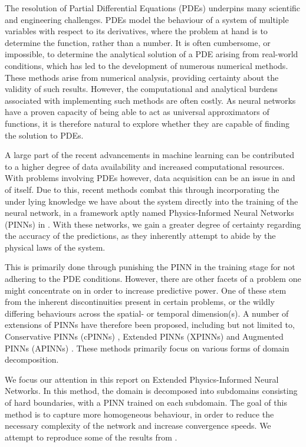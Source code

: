 The resolution of Partial Differential Equations (PDEs) underpins many scientific and engineering challenges.
PDEs model the behaviour of a system of multiple variables with respect to its derivatives, where the problem at hand is to determine the function, rather than a number.
It is often cumbersome, or impossible, to determine the analytical solution of a PDE arising from real-world conditions, which has led to the development of numerous numerical methods.
These methods arise from numerical analysis, providing certainty about the validity of such results.
However, the computational and analytical burdens associated with implementing such methods are often costly.
As neural networks have a proven capacity of being able to act as universal approximators of functions, it is therefore natural to explore whether they are capable of finding the solution to PDEs.

A large part of the recent advancements in machine learning can be contributed to a higher degree of data availability and increased computational resources.
With problems involving PDEs however, data acquisition can be an issue in and of itself.
Due to this, recent methods combat this through incorporating the under lying knowledge we have about the system directly into the training of the neural network, in a framework aptly named Physics-Informed Neural Networks (PINNs) in \textcite{RAISSI2019686}.
With these networks, we gain a greater degree of certainty regarding the accuracy of the predictions, as they inherently attempt to abide by the physical laws of the system.

This is primarily done through punishing the PINN in the training stage for not adhering to the PDE conditions.
However, there are other facets of a problem one might concentrate on in order to increase predictive power.
One of these stem from the inherent discontinuities present in certain problems, or the wildly differing behaviours across the spatial- or temporal dimension(s).
A number of extensions of PINNs have therefore been proposed, including but not limited to, Conservative PINNs (cPINNs) \cite{2020CMAME.36513028J}, Extended PINNs (XPINNs) \cite{Jagtap2020ExtendedPN} and Augmented PINNs (APINNs) \cite{Hu_2023}.
These methods primarily focus on various forms of domain decomposition.

We focus our attention in this report on Extended Physics-Informed Neural Networks.
In this method, the domain is decomposed into subdomains consisting of hard boundaries, with a PINN trained on each subdomain.
The goal of this method is to capture more homogeneous behaviour, in order to reduce the necessary complexity of the network and increase convergence speeds.
We attempt to reproduce some of the results from \textcite{XPINN_generalize}.

